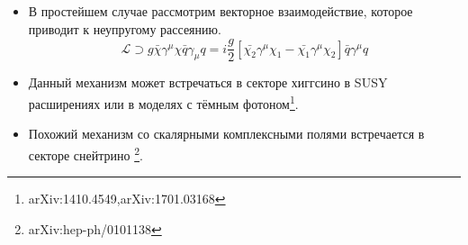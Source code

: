 \begin{itemize}
	\item В простейшем случае рассмотрим векторное взаимодействие, которое приводит к неупругому рассеянию.
	\begin{equation*} 
		\mathcal{L} \supset g\bar{\chi}\gamma^{\mu}\chi \bar{q}\gamma_{\mu}q = i\frac{g}{2}
		\left[ \bar{\chi_2}\gamma^{\mu}\chi_1  -  \bar{\chi_1}\gamma^{\mu}\chi_2\right]\bar{q}\gamma^{\mu}q
	\end{equation*}  
	\item Данный механизм может встречаться в секторе хиггсино в SUSY расширениях или в моделях с тёмным фотоном\footnote{arXiv:1410.4549,arXiv:1701.03168}.
	\item Похожий механизм со скалярными комплексными полями встречается в секторе снейтрино \footnote{arXiv:hep-ph/0101138}.
\end{itemize}